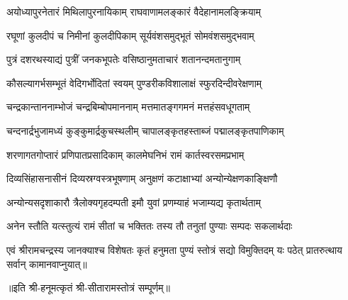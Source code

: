 
\twolineshloka
{अयोध्यापुरनेतारं मिथिलापुरनायिकाम्}
{राघवाणामलङ्कारं वैदेहानामलङ्क्रियाम्}

\twolineshloka
{रघूणां कुलदीपं च निमीनां कुलदीपिकाम्}
{सूर्यवंशसमुद्भूतं सोमवंशसमुद्भवाम्}

\twolineshloka
{पुत्रं दशरथस्याद्यं पुत्रीं जनकभूपतेः}
{वसिष्ठानुमताचारं शतानन्दमतानुगाम्}

\twolineshloka
{कौसल्यागर्भसम्भूतं वेदिगर्भोदितां स्वयम्}
{पुण्डरीकविशालाक्षं स्फुरदिन्दीवरेक्षणाम्}

\twolineshloka
{चन्द्रकान्ताननाम्भोजं चन्द्रबिम्बोपमाननाम्}
{मत्तमातङ्गगमनं मत्तहंसवधूगताम्}

\twolineshloka
{चन्दनार्द्रभुजामध्यं कुङ्कुमार्द्रकुचस्थलीम्}
{चापालङ्कृतहस्ताब्जं पद्मालङ्कृतपाणिकाम्}

\twolineshloka
{शरणागतगोप्तारं प्रणिपातप्रसादिकाम्}
{कालमेघनिभं रामं कार्तस्वरसमप्रभाम्}

\twolineshloka
{दिव्यसिंहासनासीनं दिव्यस्रग्वस्त्रभूषणाम्}
{अनुक्षणं कटाक्षाभ्यां अन्योन्येक्षणकाङ्क्षिणौ}

\twolineshloka
{अन्योन्यसदृशाकारौ त्रैलोक्यगृहदम्पती}
{इमौ युवां प्रणम्याहं भजाम्यद्य कृतार्थताम्}

\twolineshloka
{अनेन स्तौति यत्स्तुत्यं रामं सीतां च भक्तितः}
{तस्य तौ तनुतां पुण्याः सम्पदः सकलार्थदाः}

\twolineshloka
{एवं श्रीरामचन्द्रस्य जानक्याश्च विशेषतः}
{कृतं हनुमता पुण्यं स्तोत्रं सद्यो विमुक्तिदम्}
{यः पठेत् प्रातरुत्थाय सर्वान् कामानवाप्नुयात्॥}

॥इति श्री-हनूमत्कृतं श्री-सीतारामस्तोत्रं सम्पूर्णम्॥